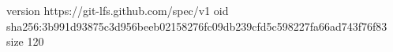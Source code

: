 version https://git-lfs.github.com/spec/v1
oid sha256:3b991d93875c3d956beeb02158276fc09db239cfd5c598227fa66ad743f76f83
size 120
